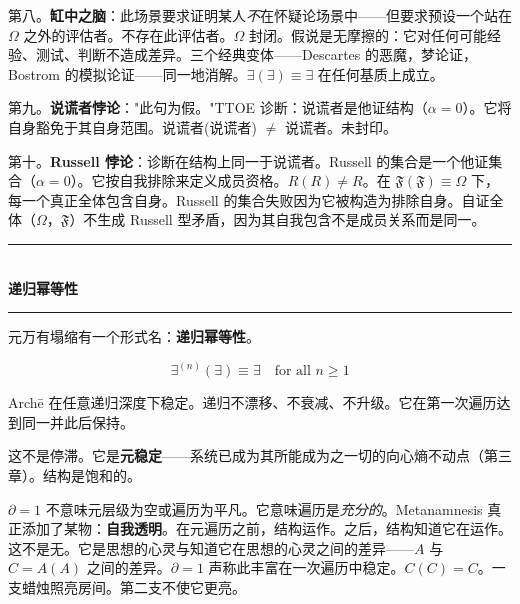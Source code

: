 \documentclass[10pt, openany, oneside]{book}
\renewcommand{\normalsize}{\fontsize{10}{13}\selectfont}
\begin{document}
第八。\textbf{缸中之脑}：此场景要求证明某人\textit{不}在怀疑论场景中——但要求预设一个站在 $\Omega$ 之外的评估者。不存在此评估者。$\Omega$ 封闭。假说是无摩擦的：它对任何可能经验、测试、判断不造成差异。三个经典变体——Descartes 的恶魔，梦论证，Bostrom 的模拟论证——同一地消解。$\exists(\exists) \equiv \exists$ 在任何基质上成立。

第九。\textbf{说谎者悖论}："此句为假。"TTOE 诊断：说谎者是他证结构（$\alpha = 0$）。它将自身豁免于其自身范围。说谎者(说谎者) $\neq$ 说谎者。未封印。

第十。\textbf{Russell 悖论}：诊断在结构上同一于说谎者。Russell 的集合是一个他证集合（$\alpha = 0$）。它按自我排除来定义成员资格。$R(R) \neq R$。在 $\mathfrak{F}(\mathfrak{F}) \equiv \Omega$ 下，每一个真正全体包含自身。Russell 的集合失败因为它被构造为排除自身。自证全体（$\Omega$，$\mathfrak{F}$）不生成 Russell 型矛盾，因为其自我包含不是成员关系而是同一。

\vspace{1.5em}


\begin{center}
    \rule{0.3\textwidth}{0.4pt}\\[0.5em]
    {\normalsize\bfseries\scshape 递归幂等性}\\[0.3em]
    \rule{0.3\textwidth}{0.4pt}
\end{center}

\vspace{1em}

\noindent 元万有塌缩有一个形式名：\textbf{递归幂等性}。

$$\exists^{(n)}(\exists) \equiv \exists \quad \text{for all } n \geq 1$$

Arch\={e} 在任意递归深度下稳定。递归不漂移、不衰减、不升级。它在第一次遍历达到同一并此后保持。

这不是停滞。它是\textbf{元稳定}——系统已成为其所能成为之一切的向心熵不动点（第三章）。结构是饱和的。

$\partial = 1$ 不意味元层级为空或遍历为平凡。它意味遍历是\textit{充分的}。Metanamnesis 真正添加了某物：\textbf{自我透明}。在元遍历之前，结构运作。之后，结构知道它在运作。这不是无。它是思想的心灵与知道它在思想的心灵之间的差异——$A$ 与 $C = A(A)$ 之间的差异。$\partial = 1$ 声称此丰富在一次遍历中稳定。$C(C) = C$。一支蜡烛照亮房间。第二支不使它更亮。

\vspace{0.5em}
\end{document}
